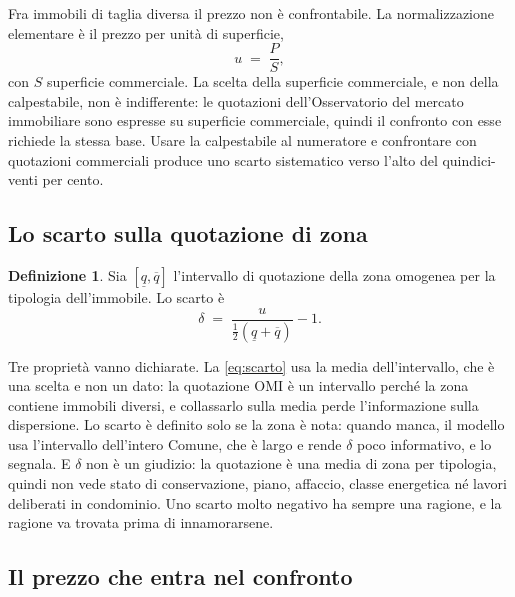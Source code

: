 \documentclass[11pt,a4paper]{article}
\theoremstyle{definition}
\newtheorem{definizione}{Definizione}[section]
\theoremstyle{plain}
\begin{document}
Fra immobili di taglia diversa il prezzo non è confrontabile. La normalizzazione elementare è il prezzo per unità di superficie,
\begin{equation}
u \;=\; \frac{P}{S},
\label{eq:prezzo-mq}
\end{equation}
con $S$ superficie commerciale. La scelta della superficie commerciale, e non della calpestabile, non è indifferente: le quotazioni dell'Osservatorio del mercato immobiliare sono espresse su superficie commerciale, quindi il confronto con esse richiede la stessa base. Usare la calpestabile al numeratore e confrontare con quotazioni commerciali produce uno scarto sistematico verso l'alto del quindici-venti per cento.

\subsection{Lo scarto sulla quotazione di zona}

\begin{definizione}
Sia $[\underline{q},\overline{q}]$ l'intervallo di quotazione della zona omogenea per la tipologia dell'immobile. Lo scarto è
\begin{equation}
\delta \;=\; \frac{u}{\tfrac{1}{2}(\underline{q}+\overline{q})} - 1 .
\label{eq:scarto}
\end{equation}
\end{definizione}

Tre proprietà vanno dichiarate. La \eqref{eq:scarto} usa la media dell'intervallo, che è una scelta e non un dato: la quotazione OMI è un intervallo perché la zona contiene immobili diversi, e collassarlo sulla media perde l'informazione sulla dispersione. Lo scarto è definito solo se la zona è nota: quando manca, il modello usa l'intervallo dell'intero Comune, che è largo e rende $\delta$ poco informativo, e lo segnala. E $\delta$ non è un giudizio: la quotazione è una media di zona per tipologia, quindi non vede stato di conservazione, piano, affaccio, classe energetica né lavori deliberati in condominio. Uno scarto molto negativo ha sempre una ragione, e la ragione va trovata prima di innamorarsene.

\subsection{Il prezzo che entra nel confronto}
\end{document}

